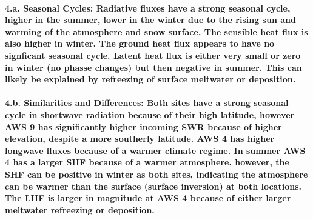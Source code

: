 \documentclass[11pt]{article}
\begin{document}
\paragraph{4.a. Seasonal Cycles: Radiative fluxes have a strong seasonal
cycle, higher in the summer, lower in the winter due to the rising sun
and warming of the atmosphere and snow surface. The sensible heat flux
is also higher in winter. The ground heat flux appears to have no
signficant seasonal cycle. Latent heat flux is either very small or zero
in winter (no phasse changes) but then negative in summer. This can
likely be explained by refreezing of surface meltwater or
deposition.}\label{a.-seasonal-cycles-radiative-fluxes-have-a-strong-seasonal-cycle-higher-in-the-summer-lower-in-the-winter-due-to-the-rising-sun-and-warming-of-the-atmosphere-and-snow-surface.-the-sensible-heat-flux-is-also-higher-in-winter.-the-ground-heat-flux-appears-to-have-no-signficant-seasonal-cycle.-latent-heat-flux-is-either-very-small-or-zero-in-winter-no-phasse-changes-but-then-negative-in-summer.-this-can-likely-be-explained-by-refreezing-of-surface-meltwater-or-deposition.}

\paragraph{4.b. Similarities and Differences: Both sites have a strong
seasonal cycle in shortwave radiation because of their high latitude,
however AWS 9 has significantly higher incoming SWR because of higher
elevation, despite a more southerly latitude. AWS 4 has higher longwave
fluxes because of a warmer climate regime. In summer AWS 4 has a larger
SHF because of a warmer atmosphere, however, the SHF can be positive in
winter as both sites, indicating the atmosphere can be warmer than the
surface (surface inversion) at both locations. The LHF is larger in
magnitude at AWS 4 because of either larger meltwater refreezing or
deposition.}\label{b.-similarities-and-differences-both-sites-have-a-strong-seasonal-cycle-in-shortwave-radiation-because-of-their-high-latitude-however-aws-9-has-significantly-higher-incoming-swr-because-of-higher-elevation-despite-a-more-southerly-latitude.-aws-4-has-higher-longwave-fluxes-because-of-a-warmer-climate-regime.-in-summer-aws-4-has-a-larger-shf-because-of-a-warmer-atmosphere-however-the-shf-can-be-positive-in-winter-as-both-sites-indicating-the-atmosphere-can-be-warmer-than-the-surface-surface-inversion-at-both-locations.-the-lhf-is-larger-in-magnitude-at-aws-4-because-of-either-larger-meltwater-refreezing-or-deposition.}
\end{document}
